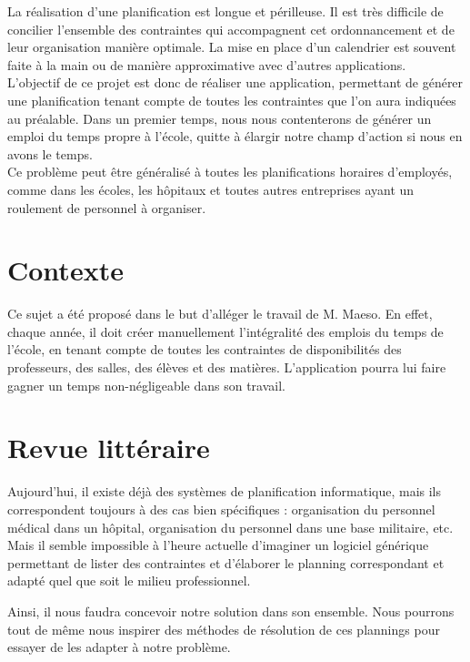 \documentclass[12pt,a4paper,french]{article}
\begin{document}
La réalisation d'une planification est longue et périlleuse. Il est très difficile de concilier l'ensemble des contraintes qui accompagnent cet ordonnancement et de leur organisation manière optimale. La mise en place d'un calendrier est souvent faite à la main ou de manière approximative avec d'autres applications.\\

L'objectif de ce projet est donc de réaliser une application, permettant de générer une planification tenant compte de toutes les contraintes que l'on aura indiquées au préalable. Dans un premier temps, nous nous contenterons de générer un emploi du temps propre à l'école, quitte à élargir notre champ d'action si nous en avons le temps.\\

Ce problème peut être généralisé à toutes les planifications horaires d'employés, comme dans les écoles, les hôpitaux et toutes autres entreprises ayant un roulement de personnel à organiser.

\newpage
\section{Contexte}

Ce sujet a été proposé dans le but d'alléger le travail de M. Maeso. En effet, chaque année, il doit créer manuellement l'intégralité des emplois du temps de l'école, en tenant compte de toutes les contraintes de disponibilités des professeurs, des salles, des élèves et des matières. L'application pourra lui faire gagner un temps non-négligeable dans son travail.

\newpage
\section{Revue littéraire}

Aujourd'hui, il existe déjà des systèmes de planification informatique, mais ils correspondent toujours à des cas bien spécifiques : organisation du personnel médical dans un hôpital, organisation du personnel dans une base militaire, etc. Mais il semble impossible à l'heure actuelle d'imaginer un logiciel générique permettant de lister des contraintes et d'élaborer le planning correspondant et adapté quel que soit le milieu professionnel.

Ainsi, il nous faudra concevoir notre solution dans son ensemble. Nous pourrons tout de même nous inspirer des méthodes de résolution de ces plannings pour essayer de les adapter à notre problème.
\end{document}

